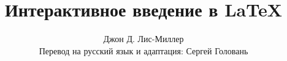 \newcommand{\genhref}[2]{\href{#1}{\linkbox{#2}}}
\newcommand{\filhref}[2]{\href{\fileuri/#1}{\linkbox{#2}}}
\newcommand{\ovlhref}[2]{\href{\wlnewdoc{#1}}{\linkbox[green!30!black]{#2}}}

\usepackage{xkeyval}
\usepackage[textsize=small]{todonotes}

\usetikzlibrary{shapes,arrows,positioning,shadows}

\usenavigationsymbolstemplate{}

\newcommand{\bftt}[1]{\textbf{\texttt{#1}}}
\newcommand{\cmd}[1]{{\color[HTML]{008000}\bftt{#1}}}
\newcommand{\bs}{\char`\\}
\newcommand{\cmdbs}[1]{\cmd{\bs#1}}
\newcommand{\lcb}{\char '173}
\newcommand{\rcb}{\char '175}
\newcommand{\cmdbegin}[1]{\cmdbs{begin\lcb}\bftt{#1}\cmd{\rcb}}
\newcommand{\cmdend}[1]{\cmdbs{end\lcb}\bftt{#1}\cmd{\rcb}}

\newcommand{\wllogo}{\textbf{Overleaf}}

\newcommand{\fileuri}{https://raw.github.com/sgolovan/latex-course/master/ru}

\newcommand{\wlserver}{https://www.overleaf.com}
\newcommand{\wlnewdoc}[1]{\wlserver/docs?snip\_uri=\fileuri/#1\&splash=none}

\def\tikzname{Ti\emph{k}Z}

\newcommand*\keystroke[1]{%
  \tikz[baseline=(key.base)]
    \node[%
      draw,
      fill=white,
      drop shadow={shadow xshift=0.25ex,shadow yshift=-0.25ex,fill=black,opacity=0.75},
      rectangle,
      rounded corners=2pt,
      inner sep=1pt,
      line width=0.5pt,
      font=\scriptsize\ttfamily
    ](key) {#1\strut}
  ;
}
\newcommand{\keystrokebftt}[1]{\keystroke{\bftt{#1}}}

\title{Интерактивное введение в \LaTeX}
\author{Джон Д. Лис-Миллер\\Перевод на русский язык и адаптация: Сергей Головань}
